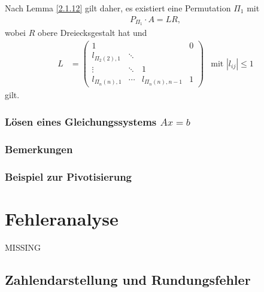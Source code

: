 \documentclass[ngerman,fontsize=11pt, paper=a4, parskip=false, titlepage=false, toc=bib]{scrbook}
\begin{document}
Nach Lemma \ref{2.1.12} gilt daher, es existiert eine Permutation $\Pi_{1}$ mit
\begin{gather*}
	P_{\Pi_1}\cdot A = LR ,
	\end{gather*}
wobei $R$ obere Dreiecksgestalt hat und
\begin{align*}
		L  &=  \begin{pmatrix}
						1 && & 0\\
						l_{\Pi_2(2),1} & \ddots & \\
						\vdots &            \ddots &  1\\
						l_{\Pi_n(n),1}& \dotsm &  l_{\Pi_n(n),n-1} & 1 
					\end{pmatrix} 
					& \text{mit } |l_{ij}| \leq 1 
\end{align*}
gilt.

\subsection{Lösen eines Gleichungssystems $Ax=b$} \label{2.2.5}
\subsection{Bemerkungen}
\subsection{Beispiel zur Pivotisierung}



\chapter{Fehleranalyse} 
MISSING
\section{Zahlendarstellung und Rundungsfehler} \label{3.1}  
\end{document}
